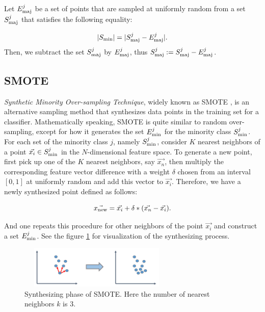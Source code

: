 Let $E_{\rm{maj}}^j$ be a set of points that are sampled at uniformly random from a set $S_{\rm{maj}}^{j}$ that satisfies the following equality:

	\begin{equation}
	|S_{\rm{min}}| = | S_{\rm{maj}}^j -  E_{\rm{maj}}^j |.
	\end{equation}
Then, we subtract the set $S_{\rm{maj}}^j$ by $E_{\rm{maj}}^j$, thus $S_{\rm{maj}}^j := S_{\rm{maj}}^j -  E_{\rm{maj}}^j$.
		
		\subsection{SMOTE}
		\textit{Synthetic Minority Over-sampling Technique}, widely known as SMOTE \cite{SMOTE}, is an alternative sampling method that synthesizes data points in the training set for a classifier. Mathematically speaking, SMOTE is quite similar to random over-sampling, except for how it generates the set $E_{\rm{min}}^j$ for the minority class $S_{\rm{min}}^j$. For each set of the minority class $j$, namely $S_{\rm{min}}^j$, consider $K$ nearest neighbors of a point $\vec{x_i} \in S_{\rm{min}}^j$ in the $N$-dimensional feature space. To generate a new point, first pick up one of the $K$ nearest neighbors, say $\vec{x_{n}}$, then multiply the corresponding feature vector difference with a weight  $\delta$  chosen from an interval $ [0,1]$ at uniformly random and add this vector to $\vec{x_i}$. Therefore, we have a newly synthesized point defined as follows:
		
		\begin{equation}
		\vec{x_{\rm{new}}} = \vec{x_{i}} + \delta*(\vec{x_{n}} - \vec{x_{i}}).
		\end{equation}

And one repeats this procedure for other neighbors of the point $\vec{x_i}$ and construct a set $E_{\rm{min}}^j$. See the figure \ref{smote} for visualization of the synthesizing process.	
		
		\begin{figure}[ht]
		\begin{center}
		\vspace{0.5cm}
		\includegraphics[clip,width=7.5cm,height = 2cm]{figs/SMOTE.png}
		\vspace{0.5cm}
		\caption{Synthesizing phase of SMOTE. Here the number of nearest neighbors $k$ is 3.}
		\label{smote}
		\end{center}
		\end{figure}
		

